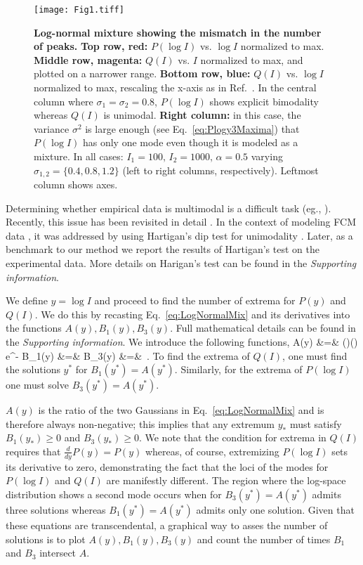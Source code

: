 \documentclass[11pt,a4paper,draft]{article}
\begin{document}
\begin{figure}[!ht]
 \centering
  \texttt{[image: Fig1.tiff]}
  \caption{\textbf{Log-normal mixture showing the mismatch in the number of peaks.} \textbf{Top row, red:} $P(\log I)$ vs. $\log I$ normalized to max. \textbf{Middle row, magenta:} $Q(I)$ vs. $I$ normalized to max, and plotted on a narrower range. \textbf{Bottom row, blue:} $Q(I)$ vs. $\log I$ normalized to max, rescaling the x-axis as in Ref.~\cite{Novo2008}. In the central column where $\sigma_1=\sigma_2=0.8$, $P(\log I)$ shows explicit bimodality whereas $Q(I)$ is unimodal. \textbf{Right column:} in this case, the variance $\sigma^2$ is large enough (see Eq.~\ref{eq:Plogy3Maxima}) that $P(\log I)$ has only one mode even though it is modeled as a mixture. In all cases: $I_1=100,\,I_2=1000,\,\alpha=0.5$ varying $\sigma_{1,2}=\{0.4,0.8,1.2\}$ (left to right columns, respectively). Leftmost column shows axes. }
  \label{fig:PlotsLinearLog}
\end{figure}

Determining whether empirical data is multimodal is a difficult task (eg., \cite{Silverman1981}). Recently, this issue has been revisited in detail \cite{Johnsson2017}. In the context of modeling FCM data \cite{Das2009}, it was addressed by using Hartigan's dip test for unimodality \cite{Hartigan1985}. Later, as a benchmark to our method we report the results of Hartigan's test on the experimental data. More details on Harigan's test can be found in the \emph{Supporting information}.
\smallskip

We define $y=\log I$ and proceed to find the number of extrema for $P(y)$ and $Q(I)$. We do this by recasting Eq.~\ref{eq:LogNormalMix} and its derivatives into the functions $A(y),B_1(y),B_3(y)$. Full mathematical details can be found in the \emph{Supporting information}. We introduce the following functions,
\bea 
\label{eq:extrema}
A(y) &=& \left(\right)\left(\right) e^{-}  \nn
B_1(y) &=&  \nn
B_3(y) &=& \,.
\eea
To find the extrema of $Q(I)$, one must find the solutions $y^*$ for $B_1(y^*)=A(y^*)$. Similarly, for the extrema of $P(\log I)$ one must solve $B_3(y^*)=A(y^*)$.

\smallskip
$A(y)$ is the ratio of the two Gaussians in Eq.~\ref{eq:LogNormalMix} and is therefore always non-negative; this implies that any extremum $y_*$ must satisfy $B_1(y_*)\ge 0$ and $B_3(y_*)\ge 0$. We note that the condition for extrema in $Q(I)$ requires that $\frac{d}{dy}P(y)=P(y)$ whereas, of course, extremizing $P(\log I)$ sets its derivative to zero, demonstrating the fact that the loci of the modes for $P(\log I)$ and $Q(I)$ are manifestly different. The region where the log-space distribution shows a second mode occurs when for $B_3(y^*)=A(y^*)$ admits three solutions whereas $B_1(y^*)=A(y^*)$ admits only one solution. Given that these equations are transcendental, a graphical way to asses the number of solutions is to plot $A(y),B_1(y),B_3(y)$ and count the number of times $B_1$ and $B_3$ intersect $A$.\smallskip
\end{document}
